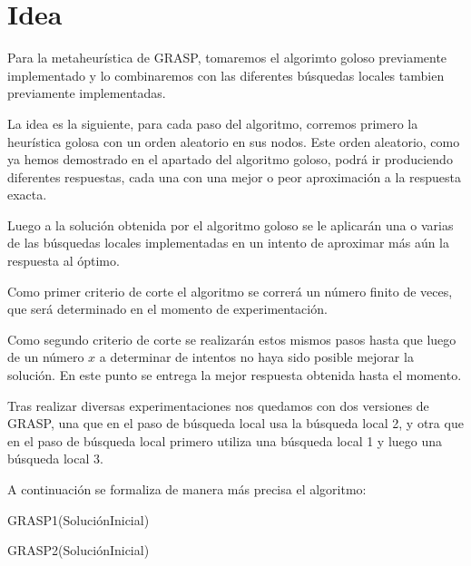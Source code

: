 \section{Idea}


Para la metaheurística de GRASP, tomaremos el algorimto goloso previamente implementado y lo combinaremos con las diferentes búsquedas locales tambien previamente implementadas.

La idea es la siguiente, para cada paso del algoritmo, corremos primero la heurística golosa con un orden aleatorio en sus nodos. Este orden aleatorio, como ya hemos demostrado en el apartado del algoritmo goloso, podrá ir produciendo diferentes respuestas, cada una con una mejor o peor aproximación a la respuesta exacta.

Luego a la solución obtenida por el algoritmo goloso se le aplicarán una o varias de las búsquedas locales implementadas en un intento de aproximar más aún la respuesta al óptimo.

Como primer criterio de corte el algoritmo se correrá un número finito de veces, que será determinado en el momento de experimentación.

Como segundo criterio de corte se realizarán estos mismos pasos hasta que luego de un número $x$ a determinar de intentos no haya sido posible mejorar la solución. En este punto se entrega la mejor respuesta obtenida hasta el momento.

Tras realizar diversas experimentaciones nos quedamos con dos versiones de GRASP, una que en el paso de búsqueda local usa la búsqueda local 2, y otra que en el paso de búsqueda local primero utiliza una búsqueda local 1 y luego una búsqueda local 3.

A continuación se formaliza de manera más precisa el algoritmo:

\begin{algorithm}
  	\begin{algorithmic}[1]\parskip=1mm
		 \caption{ GRASP1(SoluciónInicial) }
	\end{algorithmic}
\end{algorithm}

\begin{algorithm}
  	\begin{algorithmic}[1]\parskip=1mm
		 \caption{ GRASP2(SoluciónInicial) }
	\end{algorithmic}
\end{algorithm}

